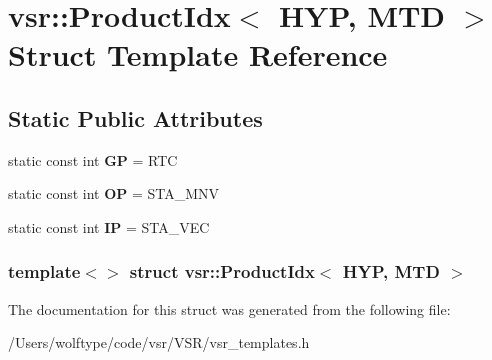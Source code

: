 \hypertarget{structvsr_1_1_product_idx_3_01_h_y_p_00_01_m_t_d_01_4}{\section{vsr\-:\-:Product\-Idx$<$ H\-Y\-P, M\-T\-D $>$ Struct Template Reference}
\label{structvsr_1_1_product_idx_3_01_h_y_p_00_01_m_t_d_01_4}
}
\subsection*{Static Public Attributes}
\begin{DoxyCompactItemize}
\item 
\hypertarget{structvsr_1_1_product_idx_3_01_h_y_p_00_01_m_t_d_01_4_aa6df6fe9a0699dabf5fdd6f70a4eaa42}{static const int {\bfseries G\-P} = R\-T\-C}\label{structvsr_1_1_product_idx_3_01_h_y_p_00_01_m_t_d_01_4_aa6df6fe9a0699dabf5fdd6f70a4eaa42}

\item 
\hypertarget{structvsr_1_1_product_idx_3_01_h_y_p_00_01_m_t_d_01_4_a960cbb631ba36a00bcf4f69e3a138850}{static const int {\bfseries O\-P} = S\-T\-A\-\_\-\-M\-N\-V}\label{structvsr_1_1_product_idx_3_01_h_y_p_00_01_m_t_d_01_4_a960cbb631ba36a00bcf4f69e3a138850}

\item 
\hypertarget{structvsr_1_1_product_idx_3_01_h_y_p_00_01_m_t_d_01_4_adc7cd79a7b546dbb0112d8abd7ffdf39}{static const int {\bfseries I\-P} = S\-T\-A\-\_\-\-V\-E\-C}\label{structvsr_1_1_product_idx_3_01_h_y_p_00_01_m_t_d_01_4_adc7cd79a7b546dbb0112d8abd7ffdf39}

\end{DoxyCompactItemize}
\subsubsection*{template$<$$>$ struct vsr\-::\-Product\-Idx$<$ H\-Y\-P, M\-T\-D $>$}



The documentation for this struct was generated from the following file\-:\begin{DoxyCompactItemize}
\item 
/\-Users/wolftype/code/vsr/\-V\-S\-R/vsr\-\_\-templates.\-h\end{DoxyCompactItemize}
